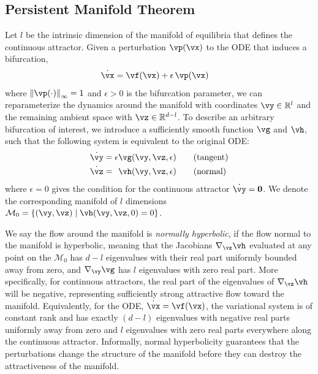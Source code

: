 \documentclass{article} %
\newcounter{ct}
\newcommand{\reals}{\mathbb{R}}
\newcommand{\manifold}{\mathcal{M}}
\newcommand{\uniformNorm}[1]{\left\|#1\right\|_\infty} %
\theoremstyle{definition}
\theoremstyle{remark}
\begin{document}
\subsection{Persistent Manifold Theorem}\label{sec:imt}
Let \(l\) be the intrinsic dimension of the manifold of equilibria that defines the continuous attractor.
Given a perturbation \(\vp(\vx)\) to the ODE that induces a bifurcation,
\begin{align}\label{eq:perturbation:nonparam}
	\dot{\vx} &= \vf(\vx) + \epsilon\,\vp(\vx)
\end{align}
where \(\uniformNorm{\vp(\cdot)} = 1\) and \(\epsilon > 0\) is the bifurcation parameter,
we can reparameterize the dynamics around the manifold with coordinates \(\vy \in \reals^l\) and the remaining ambient space with \(\vz \in \reals^{d-l}\).
To describe an arbitrary bifurcation of interest, we introduce a sufficiently smooth function \(\vg\) and \(\vh\), such that the following system is equivalent to the original ODE:
\begin{align}
    \dot{\vy} &=           \epsilon  \vg(\vy, \vz, \epsilon) \qquad \text{(tangent)}\label{eq:fenichel:flowtangent}\\
    \dot{\vz} &= \hphantom{\epsilon} \vh(\vy, \vz, \epsilon) \qquad \text{(normal)}\label{eq:fenichel:flownormal}
\end{align}
where \(\epsilon = 0\) gives the condition for the continuous attractor \(\dot{\vy} = \mathbf{0}\).
We denote the corresponding manifold of \(l\) dimensions \(\manifold_0 = \{(\vy,\vz) \mid \vh(\vy,\vz,0) = 0\}\).

We say the flow around the manifold is \emph{normally hyperbolic}, if the flow normal to the manifold is hyperbolic, meaning that the Jacobians \(\nabla_\vz \vh\) evaluated at any point on the \(\manifold_0\) has \(d-l\) eigenvalues with their real part uniformly bounded away from zero, and \(\nabla_\vy \vg\) has \(l\) eigenvalues with zero real part.
More specifically, for continuous attractors, the real part of the eigenvalues of \(\nabla_\vz \vh\) will be negative, representing sufficiently strong attractive flow toward the manifold.
Equivalently, for the ODE, \(\dot{\vx} = \vf(\vx)\), the variational system is of constant rank and has exactly \((d-l)\) eigenvalues with negative real parts uniformly away from zero and \(l\) eigenvalues with zero real parts everywhere along the continuous attractor.
Informally, normal hyperbolicity guarantees that the perturbations change the structure of the manifold before they can destroy the attractiveness of the manifold.
\end{document}
